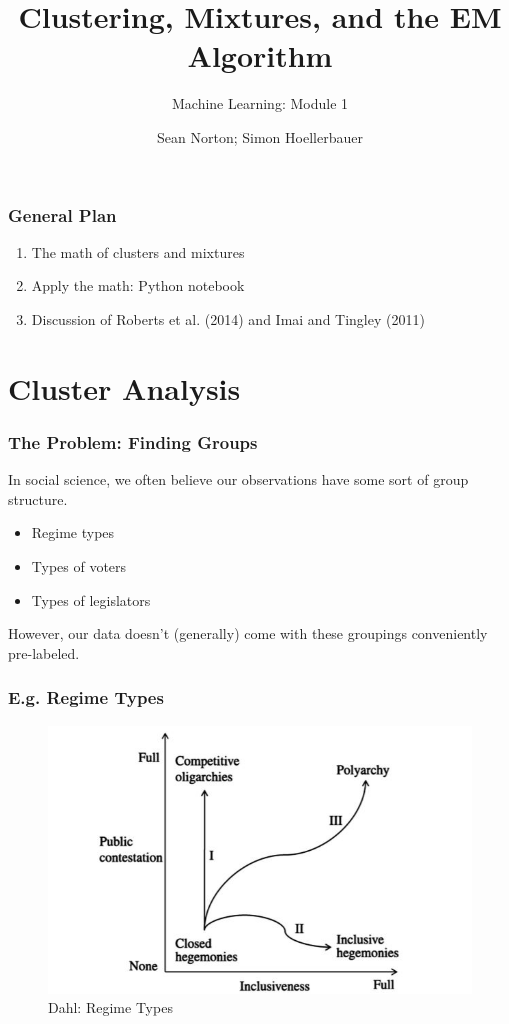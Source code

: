 \documentclass{beamer}
\title{Clustering, Mixtures, and the EM Algorithm}
\subtitle{Machine Learning: Module 1}
\author{Sean Norton; Simon Hoellerbauer}
\begin{document}
\begin{frame}
	\titlepage
\end{frame}

\begin{frame}
\frametitle{General Plan}
	\begin{enumerate}
		\item The math of clusters and mixtures
		\item Apply the math: Python notebook
		\item Discussion of Roberts et al. (2014) and Imai and Tingley (2011)
	\end{enumerate}
\end{frame}
\section{Cluster Analysis}

\begin{frame}
\frametitle{The Problem: Finding Groups}
	In social science, we often believe our observations have some sort of group structure.
	\begin{itemize}
		\item Regime types
		\item Types of voters
		\item Types of legislators		
	\end{itemize}
	However, our data doesn't (generally) come with these groupings conveniently pre-labeled.

\end{frame}

\begin{frame}
\frametitle{E.g. Regime Types}
	
	\begin{figure}
		\centering
		\includegraphics[width=0.7\linewidth]{dahl}
		\caption{Dahl: Regime Types}
		\label{fig:dahl}
	\end{figure}

\end{frame}
\end{document}
